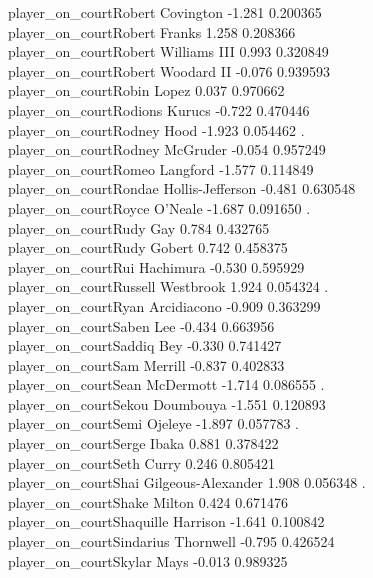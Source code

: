 \documentclass[
  landscape]{article}
\begin{document}
player\_on\_courtRobert Covington -1.281 0.200365\\
player\_on\_courtRobert Franks 1.258 0.208366\\
player\_on\_courtRobert Williams III 0.993 0.320849\\
player\_on\_courtRobert Woodard II -0.076 0.939593\\
player\_on\_courtRobin Lopez 0.037 0.970662\\
player\_on\_courtRodions Kurucs -0.722 0.470446\\
player\_on\_courtRodney Hood -1.923 0.054462 .\\
player\_on\_courtRodney McGruder -0.054 0.957249\\
player\_on\_courtRomeo Langford -1.577 0.114849\\
player\_on\_courtRondae Hollis-Jefferson -0.481 0.630548\\
player\_on\_courtRoyce O'Neale -1.687 0.091650 .\\
player\_on\_courtRudy Gay 0.784 0.432765\\
player\_on\_courtRudy Gobert 0.742 0.458375\\
player\_on\_courtRui Hachimura -0.530 0.595929\\
player\_on\_courtRussell Westbrook 1.924 0.054324 .\\
player\_on\_courtRyan Arcidiacono -0.909 0.363299\\
player\_on\_courtSaben Lee -0.434 0.663956\\
player\_on\_courtSaddiq Bey -0.330 0.741427\\
player\_on\_courtSam Merrill -0.837 0.402833\\
player\_on\_courtSean McDermott -1.714 0.086555 .\\
player\_on\_courtSekou Doumbouya -1.551 0.120893\\
player\_on\_courtSemi Ojeleye -1.897 0.057783 .\\
player\_on\_courtSerge Ibaka 0.881 0.378422\\
player\_on\_courtSeth Curry 0.246 0.805421\\
player\_on\_courtShai Gilgeous-Alexander 1.908 0.056348 .\\
player\_on\_courtShake Milton 0.424 0.671476\\
player\_on\_courtShaquille Harrison -1.641 0.100842\\
player\_on\_courtSindarius Thornwell -0.795 0.426524\\
player\_on\_courtSkylar Mays -0.013 0.989325\\
\end{document}
